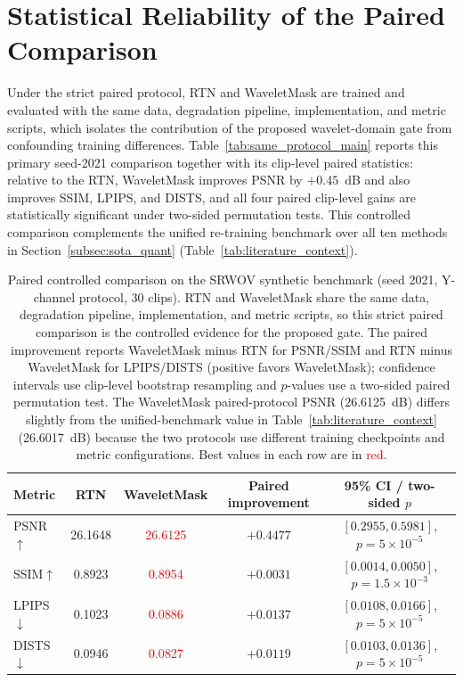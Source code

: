 \section{Statistical Reliability of the Paired Comparison}\label{app:stats}

Under the strict paired protocol, RTN and WaveletMask are trained and evaluated with the same data, degradation pipeline, implementation, and metric scripts, which isolates the contribution of the proposed wavelet-domain gate from confounding training differences. Table~\ref{tab:same_protocol_main} reports this primary seed-2021 comparison together with its clip-level paired statistics: relative to the RTN, WaveletMask improves PSNR by $+0.45$~dB and also improves SSIM, LPIPS, and DISTS, and all four paired clip-level gains are statistically significant under two-sided permutation tests. This controlled comparison complements the unified re-training benchmark over all ten methods in Section~\ref{subsec:sota_quant} (Table~\ref{tab:literature_context}).

\begin{table}[t]
\caption{Paired controlled comparison on the SRWOV synthetic benchmark (seed 2021, Y-channel protocol, 30 clips). RTN and WaveletMask share the same data, degradation pipeline, implementation, and metric scripts, so this strict paired comparison is the controlled evidence for the proposed gate. The paired improvement reports WaveletMask minus RTN for PSNR/SSIM and RTN minus WaveletMask for LPIPS/DISTS (positive favors WaveletMask); confidence intervals use clip-level bootstrap resampling and $p$-values use a two-sided paired permutation test. The WaveletMask paired-protocol PSNR (26.6125~dB) differs slightly from the unified-benchmark value in Table~\ref{tab:literature_context} (26.6017~dB) because the two protocols use different training checkpoints and metric configurations. Best values in each row are in \textcolor{red}{red}.\label{tab:same_protocol_main}\label{tab:paired_seed2021_stats}}
\footnotesize
\begin{tabularx}{\textwidth}{lCCCC}
\toprule
\textbf{Metric} & \textbf{RTN} & \textbf{WaveletMask} & \textbf{Paired improvement} & \textbf{95\% CI / two-sided $p$} \\
\midrule
PSNR$\uparrow$  & 26.1648 & \textcolor{red}{26.6125} & $+0.4477$ & $[0.2955, 0.5981]$, $p=5\times10^{-5}$ \\
SSIM$\uparrow$  & 0.8923  & \textcolor{red}{0.8954}  & $+0.0031$ & $[0.0014, 0.0050]$, $p=1.5\times10^{-3}$ \\
LPIPS$\downarrow$ & 0.1023 & \textcolor{red}{0.0886} & $+0.0137$ & $[0.0108, 0.0166]$, $p=5\times10^{-5}$ \\
DISTS$\downarrow$ & 0.0946 & \textcolor{red}{0.0827} & $+0.0119$ & $[0.0103, 0.0136]$, $p=5\times10^{-5}$ \\
\bottomrule
\end{tabularx}
\normalsize
\end{table}

